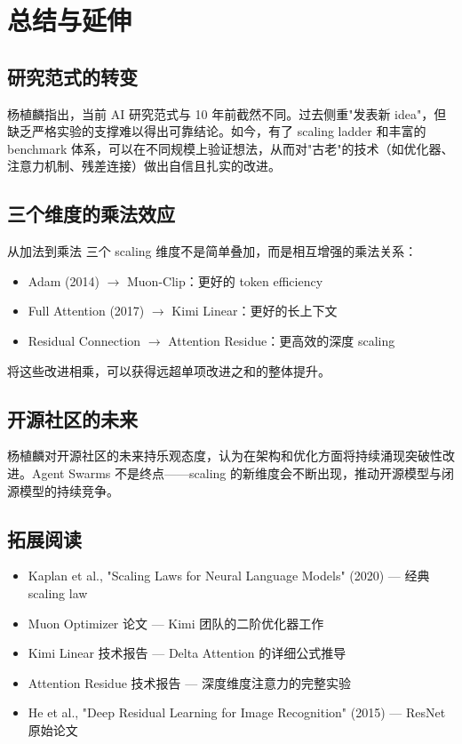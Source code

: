 \section{总结与延伸}

\subsection{研究范式的转变}

杨植麟指出，当前 AI 研究范式与 10 年前截然不同。过去侧重"发表新 idea"，但缺乏严格实验的支撑难以得出可靠结论。如今，有了 scaling ladder 和丰富的 benchmark 体系，可以在不同规模上验证想法，从而对"古老"的技术（如优化器、注意力机制、残差连接）做出自信且扎实的改进。

\subsection{三个维度的乘法效应}

\begin{importantbox}{从加法到乘法}
三个 scaling 维度不是简单叠加，而是相互增强的乘法关系：
\begin{itemize}
    \item Adam (2014) $\rightarrow$ Muon-Clip：更好的 token efficiency
    \item Full Attention (2017) $\rightarrow$ Kimi Linear：更好的长上下文
    \item Residual Connection $\rightarrow$ Attention Residue：更高效的深度 scaling
\end{itemize}
将这些改进相乘，可以获得远超单项改进之和的整体提升。
\end{importantbox}

\subsection{开源社区的未来}

杨植麟对开源社区的未来持乐观态度，认为在架构和优化方面将持续涌现突破性改进。Agent Swarms 不是终点——scaling 的新维度会不断出现，推动开源模型与闭源模型的持续竞争。

\subsection{拓展阅读}

\begin{itemize}
    \item Kaplan et al., "Scaling Laws for Neural Language Models" (2020) --- 经典 scaling law
    \item Muon Optimizer 论文 --- Kimi 团队的二阶优化器工作
    \item Kimi Linear 技术报告 --- Delta Attention 的详细公式推导
    \item Attention Residue 技术报告 --- 深度维度注意力的完整实验
    \item He et al., "Deep Residual Learning for Image Recognition" (2015) --- ResNet 原始论文
\end{itemize}



